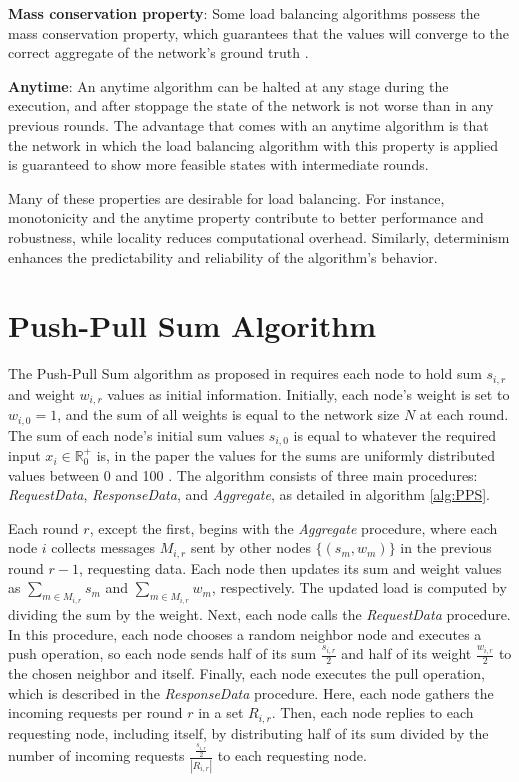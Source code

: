 \textbf{Mass conservation property}: Some load balancing algorithms possess the mass conservation property, which guarantees that the values will converge to the correct aggregate of the network's ground truth \cite{nugroho2023PushPullSumDataAg}.

\textbf{Anytime}: An anytime algorithm can be halted at any stage during the execution, and after stoppage the state of the network is not worse than in any previous rounds. The advantage that comes with an anytime algorithm is that the network in which the load balancing algorithm with this property is applied is guaranteed to show more feasible states with intermediate rounds. \cite{Dinitz2023DAB}

Many of these properties are desirable for load balancing. For instance, monotonicity and the anytime property contribute to better performance and robustness, while locality reduces computational overhead. Similarly, determinism enhances the predictability and reliability of the algorithm's behavior.

\section{Push-Pull Sum Algorithm}\label{sec:classicPPS}
The Push-Pull Sum algorithm as proposed in \cite{nugroho2023PushPullSumDataAg} requires each node to hold sum $s_{i,r}$ and weight $w_{i,r}$ values as initial information. Initially, each node's weight is set to $w_{i,0} = 1$, and the sum of all weights is equal to the network size $N$ at each round. The sum of each node's initial sum values $s_{i,0}$ is equal to whatever the required input $x_i \in \mathbb{R}^{+}_{0}$ is, in the paper the values for the sums are uniformly distributed values between 0 and 100 \cite{nugroho2023PushPullSumDataAg}. The algorithm consists of three main procedures: \textit{RequestData}, \textit{ResponseData}, and \textit{Aggregate}, as detailed in algorithm \ref{alg:PPS}.

Each round $r$, except the first, begins with the \textit{Aggregate} procedure, where each node $i$ collects messages $M_{i,r}$ sent by other nodes $\{(s_m, w_m)\}$ in the previous round $r-1$, requesting data. Each node then updates its sum and weight values as $\sum_{m \in M_{i,r}}{s_m}$ and $\sum_{m \in M_{i,r}}{w_m}$, respectively. The updated load is computed by dividing the sum by the weight. Next, each node calls the \textit{RequestData} procedure. In this procedure, each node chooses a random neighbor node and executes a push operation, so each node sends half of its sum $\frac{s_{i,r}}{2}$ and half of its weight $\frac{w_{i,r}}{2}$ to the chosen neighbor and itself. Finally, each node executes the pull operation, which is described in the \textit{ResponseData} procedure. Here, each node gathers the incoming requests per round $r$ in a set $R_{i, r}$. Then, each node replies to each requesting node, including itself, by distributing half of its sum divided by the number of incoming requests $\frac{\frac{s_{i,r}}{2}}{|R_{i, r}|}$ to each requesting node.

